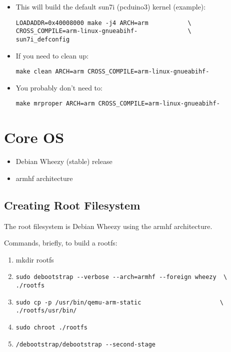 \begin{itemize}
  \item{This will build the default sun7i (pcduino3) kernel (example):
  
  \begin{verbatim}
LOADADDR=0x40008000 make -j4 ARCH=arm           \
CROSS_COMPILE=arm-linux-gnueabihf-              \
sun7i_defconfig
  \end{verbatim}
  }

  \item{If you need to clean up:
  
  \begin{verbatim}
make clean ARCH=arm CROSS_COMPILE=arm-linux-gnueabihf-
  \end{verbatim}
  }

  \item{You probably don't need to:
  
  \begin{verbatim}
make mrproper ARCH=arm CROSS_COMPILE=arm-linux-gnueabihf-
  \end{verbatim}
  }
\end{itemize}


\section{Core OS}
\begin{itemize}
  \item{Debian Wheezy (stable) release}
  \item{armhf architecture}
\end{itemize}

\subsection{Creating Root Filesystem}
The root filesystem is Debian Wheezy using the armhf architecture.

Commands, briefly, to build a rootfs:

\begin{enumerate}
  \item{mkdir rootfs}
  \item{
  \begin{verbatim}
sudo debootstrap --verbose --arch=armhf --foreign wheezy  \
./rootfs
  \end{verbatim}
  }

  \item{
  \begin{verbatim}
sudo cp -p /usr/bin/qemu-arm-static                      \
./rootfs/usr/bin/
  \end{verbatim}
  }

  \item{
\verb|sudo chroot ./rootfs|
  }

  \item{
\verb|/debootstrap/debootstrap --second-stage|
  }

\end{enumerate}


